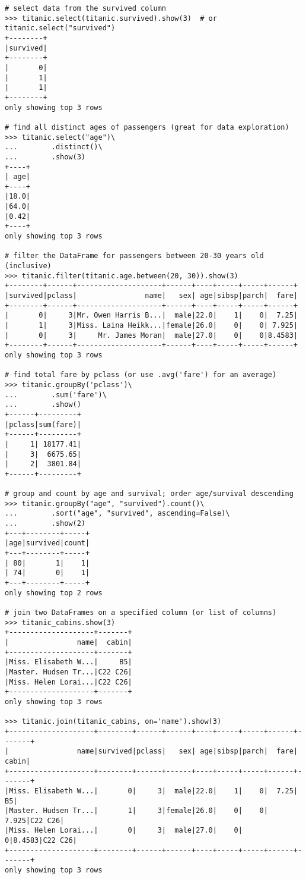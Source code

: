 \begin{lstlisting}
# select data from the survived column
>>> titanic.select(titanic.survived).show(3)  # or titanic.select("survived")
+--------+
|survived|
+--------+
|       0|
|       1|
|       1|
+--------+
only showing top 3 rows

# find all distinct ages of passengers (great for data exploration)
>>> titanic.select("age")\
...        .distinct()\
...        .show(3)
+----+
| age|
+----+
|18.0|
|64.0|
|0.42|
+----+
only showing top 3 rows

# filter the DataFrame for passengers between 20-30 years old (inclusive)
>>> titanic.filter(titanic.age.between(20, 30)).show(3)
+--------+------+--------------------+------+----+-----+-----+------+
|survived|pclass|                name|   sex| age|sibsp|parch|  fare|
+--------+------+--------------------+------+----+-----+-----+------+
|       0|     3|Mr. Owen Harris B...|  male|22.0|    1|    0|  7.25|
|       1|     3|Miss. Laina Heikk...|female|26.0|    0|    0| 7.925|
|       0|     3|     Mr. James Moran|  male|27.0|    0|    0|8.4583|
+--------+------+--------------------+------+----+-----+-----+------+
only showing top 3 rows

# find total fare by pclass (or use .avg('fare') for an average)
>>> titanic.groupBy('pclass')\
...        .sum('fare')\
...        .show()
+------+---------+
|pclass|sum(fare)|
+------+---------+
|     1| 18177.41|
|     3|  6675.65|
|     2|  3801.84|
+------+---------+

# group and count by age and survival; order age/survival descending
>>> titanic.groupBy("age", "survived").count()\
...		   .sort("age", "survived", ascending=False)\
...		   .show(2)
+---+--------+-----+
|age|survived|count|
+---+--------+-----+
| 80|       1|    1|
| 74|       0|    1|
+---+--------+-----+
only showing top 2 rows

# join two DataFrames on a specified column (or list of columns)
>>> titanic_cabins.show(3)
+--------------------+-------+
|                name|  cabin|
+--------------------+-------+
|Miss. Elisabeth W...|     B5|
|Master. Hudsen Tr...|C22 C26|
|Miss. Helen Lorai...|C22 C26|
+--------------------+-------+
only showing top 3 rows

>>> titanic.join(titanic_cabins, on='name').show(3)
+--------------------+--------+------+------+----+-----+-----+------+-------+
|                name|survived|pclass|   sex| age|sibsp|parch|  fare|  cabin|
+--------------------+--------+------+------+----+-----+-----+------+-------+
|Miss. Elisabeth W...|       0|     3|  male|22.0|    1|    0|  7.25|     B5|
|Master. Hudsen Tr...|       1|     3|female|26.0|    0|    0| 7.925|C22 C26|
|Miss. Helen Lorai...|       0|     3|  male|27.0|    0|    0|8.4583|C22 C26|
+--------------------+--------+------+------+----+-----+-----+------+-------+
only showing top 3 rows
\end{lstlisting}

